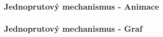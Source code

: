 \begin{frame}
	\frametitle{Jednoprutový mechanismus - Animace}
	\begin{figure}
		\centering
	\end{figure}
\end{frame}

\begin{frame}
	\frametitle{Jednoprutový mechanismus - Graf}
	
\end{frame}